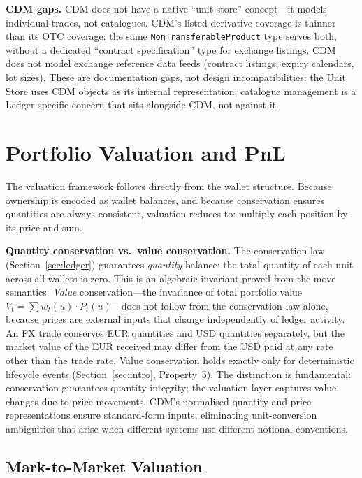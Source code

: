 \documentclass[11pt,a4paper]{article}
\begin{document}
\noindent\textbf{CDM gaps.} CDM does not have a native ``unit store'' concept---it models individual trades, not catalogues. CDM's listed derivative coverage is thinner than its OTC coverage: the same \texttt{NonTransferableProduct} type serves both, without a dedicated ``contract specification'' type for exchange listings. CDM does not model exchange reference data feeds (contract listings, expiry calendars, lot sizes). These are documentation gaps, not design incompatibilities: the Unit Store uses CDM objects as its internal representation; catalogue management is a Ledger-specific concern that sits alongside CDM, not against it.

\clearpage
\section{Portfolio Valuation and PnL}
\label{sec:valuation}

The valuation framework follows directly from the wallet structure. Because ownership is encoded as wallet balances, and because conservation ensures quantities are always consistent, valuation reduces to: multiply each position by its price and sum.

\medskip
\noindent\textbf{Quantity conservation vs.\ value conservation.} The conservation law (Section~\ref{sec:ledger}) guarantees \emph{quantity} balance: the total quantity of each unit across all wallets is zero. This is an algebraic invariant proved from the move semantics. \emph{Value} conservation---the invariance of total portfolio value $V_t = \sum w_t(u) \cdot P_t(u)$---does not follow from the conservation law alone, because prices are external inputs that change independently of ledger activity. An FX trade conserves EUR quantities and USD quantities separately, but the market value of the EUR received may differ from the USD paid at any rate other than the trade rate. Value conservation holds exactly only for deterministic lifecycle events (Section~\ref{sec:intro}, Property~5). The distinction is fundamental: conservation guarantees quantity integrity; the valuation layer captures value changes due to price movements. CDM's normalised quantity and price representations ensure standard-form inputs, eliminating unit-conversion ambiguities that arise when different systems use different notional conventions.

\subsection{Mark-to-Market Valuation}
\end{document}
